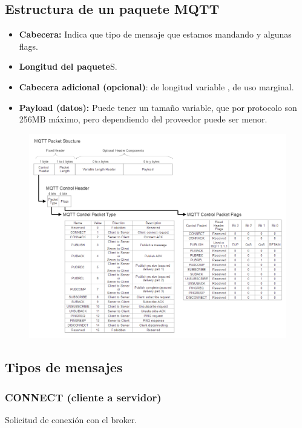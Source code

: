 \documentclass[12pt]{report} %
\begin{document}
\subsection{Estructura de un paquete MQTT}
\begin{itemize}
	\item \textbf{Cabecera:} Indica que tipo de mensaje que estamos mandando y algunas flags.
	\item \textbf{Longitud del paquete}S. 
	\item \textbf{Cabecera adicional (opcional)}: de longitud variable , de uso marginal. 
	\item \textbf{Payload (datos):} Puede tener un tamaño variable, que por protocolo son 256MB máximo, pero dependiendo del proveedor puede ser menor.
\end{itemize}

\begin{figure}[H]
	{\includegraphics[scale=.5]{f4bd0f8a-2e92-4cdd-abfc-c7b067788d4a.png}}
\end{figure}

\subsection{Tipos de mensajes} 
\subsubsection{CONNECT (cliente a servidor)}
Solicitud de conexión con el broker. 
\end{document}
